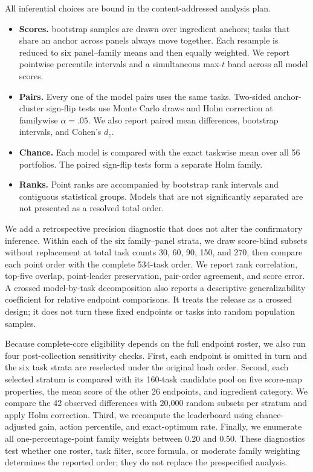 \documentclass[10pt,twocolumn]{article}
\begin{document}
All inferential choices are bound in the content-addressed analysis plan.
\begin{itemize}
  \item \textbf{Scores.} \FBBootstrapResamples{} bootstrap samples are drawn over ingredient
  anchors; tasks that share an anchor across panels always move together. Each resample is reduced
  to six panel--family means and then equally weighted. We report pointwise
  percentile intervals and a simultaneous max-$t$ band across all \FBModels{} model scores.
  \item \textbf{Pairs.} Every one of the \FBPairs{} model pairs uses the same \FBTasks{} tasks.
  Two-sided anchor-cluster sign-flip tests use
  \FBPermutationResamples{} Monte Carlo draws and Holm correction at familywise $\alpha=.05$.
  We also report paired mean differences, bootstrap intervals, and Cohen's $d_z$.
  \item \textbf{Chance.} Each model is compared with the exact taskwise mean over all 56
  portfolios. The \FBModels{} paired sign-flip tests form a separate Holm family.
  \item \textbf{Ranks.} Point ranks are accompanied by bootstrap rank intervals and contiguous
  statistical groups. Models that are not significantly separated are not presented as a resolved
  total order.
\end{itemize}

We add a retrospective precision diagnostic that does not alter the confirmatory inference.
Within each of the six family--panel strata, we draw \FBStabilityReplicates{} score-blind subsets
without replacement at total task counts 30, 60, 90, 150, and 270, then compare each point order
with the complete 534-task order. We report rank correlation, top-five overlap, point-leader
preservation, pair-order agreement, and score error. A crossed model-by-task decomposition also
reports a descriptive generalizability coefficient for relative endpoint comparisons. It treats
the release as a crossed design; it does not turn these fixed endpoints or tasks into random
population samples.

Because complete-core eligibility depends on the full endpoint roster, we also run four
post-collection sensitivity checks. First, each endpoint is omitted in turn and the six task
strata are reselected under the original hash order. Second, each selected stratum is compared
with its 160-task candidate pool on five score-map properties, the mean score of the other 26
endpoints, and ingredient category. We compare the 42 observed differences with 20,000 random
subsets per stratum and apply Holm correction. Third, we recompute the leaderboard using
chance-adjusted gain, action percentile, and exact-optimum rate. Finally, we enumerate all
one-percentage-point family weights between 0.20 and 0.50. These diagnostics test whether one
roster, task filter, score formula, or moderate family weighting determines the reported order;
they do not replace the prespecified analysis.
\end{document}
